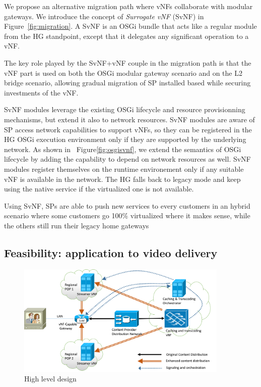 We propose an alternative migration path where vNFs collaborate with modular gateways. We introduce the concept of \textit{Surrogate vNF} (SvNF) in Figure~\ref{fig:migration}. 
A SvNF is an OSGi bundle that acts like a regular module from the HG standpoint, except that it delegates any significant operation to a vNF.

The key role played by the SvNF+vNF couple in the migration path is that the vNF part is used on both the OSGi modular gateway scenario and on the L2 bridge scenario, allowing gradual migration of SP installed based while securing investments of the vNF. 

SvNF modules leverage the existing OSGi lifecycle and resource provisionning mechanisms, but extend it also to network resources. SvNF modules are aware of SP access network capabilities to support vNFs, so they can be registered in the HG OSGi execution environment only if they are supported by the underlying network.
As shown in ~Figure\ref{fig:osgisvnf}, we extend the semantics of OSGi lifecycle by adding the capability to depend on network resources as well. SvNF modules register themselves on the runtime environement only if any suitable vNF is available in the network. The HG falls back to legacy mode and keep using the native service if the virtualized one is not available.

Using SvNF, SPs are able to push new services to every customers in an hybrid scenario where some customers go 100\% virtualized where it makes sense, while the others still run their legacy home gateways

 
\subsection{Feasibility: application to video delivery}
\begin{figure}
	
	\center

	\includegraphics[width=0.90\textwidth,natwidth=8132,natheight=4335]{fig/highleveldesign.png}
	\caption{ High level design
    \label{fig:hld}
    }

\end{figure}

